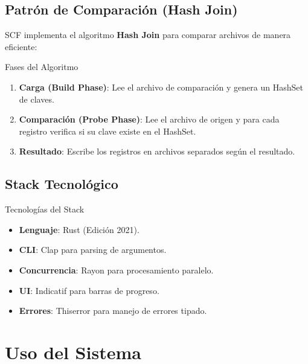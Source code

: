 \subsection{Patrón de Comparación (Hash Join)}

SCF implementa el algoritmo \textbf{Hash Join} para comparar archivos de manera eficiente:

\begin{caja}{Fases del Algoritmo}
\begin{enumerate}
\item \textbf{Carga (Build Phase)}: Lee el archivo de comparación y genera un HashSet de claves.
\item \textbf{Comparación (Probe Phase)}: Lee el archivo de origen y para cada registro verifica si su clave existe en el HashSet.
\item \textbf{Resultado}: Escribe los registros en archivos separados según el resultado.
\end{enumerate}
\end{caja}


\bigskip

\subsection{Stack Tecnológico}

\begin{caja}{Tecnologías del Stack}
\begin{itemize}
\item \textbf{Lenguaje}: Rust (Edición 2021).
\item \textbf{CLI}: Clap para parsing de argumentos.
\item \textbf{Concurrencia}: Rayon para procesamiento paralelo.
\item \textbf{UI}: Indicatif para barras de progreso.
\item \textbf{Errores}: Thiserror para manejo de errores tipado.
\end{itemize}
\end{caja}


\section{Uso del Sistema}


